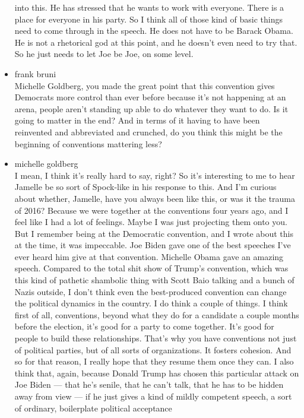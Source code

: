 \begin{itemize}
  into this. He has stressed that he wants to work with everyone. There
  is a place for everyone in his party. So I think all of those kind of
  basic things need to come through in the speech. He does not have to
  be Barack Obama. He is not a rhetorical god at this point, and he
  doesn't even need to try that. So he just needs to let Joe be Joe, on
  some level.
\item
  frank bruni\\
  Michelle Goldberg, you made the great point that this convention gives
  Democrats more control than ever before because it's not happening at
  an arena, people aren't standing up able to do whatever they want to
  do. Is it going to matter in the end? And in terms of it having to
  have been reinvented and abbreviated and crunched, do you think this
  might be the beginning of conventions mattering less?
\item
  michelle goldberg\\
  I mean, I think it's really hard to say, right? So it's interesting to
  me to hear Jamelle be so sort of Spock-like in his response to this.
  And I'm curious about whether, Jamelle, have you always been like
  this, or was it the trauma of 2016? Because we were together at the
  conventions four years ago, and I feel like I had a lot of feelings.
  Maybe I was just projecting them onto you. But I remember being at the
  Democratic convention, and I wrote about this at the time, it was
  impeccable. Joe Biden gave one of the best speeches I've ever heard
  him give at that convention. Michelle Obama gave an amazing speech.
  Compared to the total shit show of Trump's convention, which was this
  kind of pathetic shambolic thing with Scott Baio talking and a bunch
  of Nazis outside, I don't think even the best-produced convention can
  change the political dynamics in the country. I do think a couple of
  things. I think first of all, conventions, beyond what they do for a
  candidate a couple months before the election, it's good for a party
  to come together. It's good for people to build these relationships.
  That's why you have conventions not just of political parties, but of
  all sorts of organizations. It fosters cohesion. And so for that
  reason, I really hope that they resume them once they can. I also
  think that, again, because Donald Trump has chosen this particular
  attack on Joe Biden --- that he's senile, that he can't talk, that he
  has to be hidden away from view --- if he just gives a kind of mildly
  competent speech, a sort of ordinary, boilerplate political acceptance

\end{itemize}
